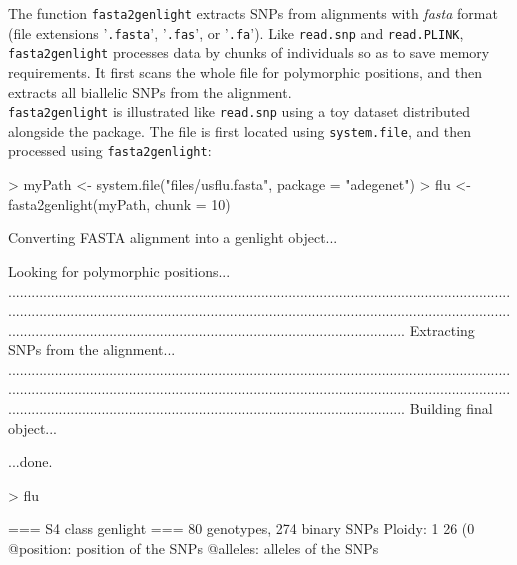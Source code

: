 \documentclass{article}
\begin{document}
The function \texttt{fasta2genlight} extracts SNPs from alignments with \textit{fasta} format (file
extensions '\texttt{.fasta}', '\texttt{.fas}', or '\texttt{.fa}').
Like \texttt{read.snp} and \texttt{read.PLINK}, \texttt{fasta2genlight} processes data by chunks of
individuals so as to save memory requirements.
It first scans the whole file for polymorphic positions, and then extracts all biallelic SNPs from
the alignment.
\\

\texttt{fasta2genlight} is illustrated like \texttt{read.snp} using a toy dataset distributed
alongside the package.
The file is first located using \texttt{system.file}, and then processed using \texttt{fasta2genlight}:
\begin{Schunk}
\begin{Sinput}
> myPath <- system.file("files/usflu.fasta", package = "adegenet")
> flu <- fasta2genlight(myPath, chunk = 10)
\end{Sinput}
\begin{Soutput}
 Converting FASTA alignment into a genlight object... 


 Looking for polymorphic positions... 
........................................................................................................................................................................................................................................................................................................................................................................
 Extracting SNPs from the alignment... 
........................................................................................................................................................................................................................................................................................................................................................................
 Building final object... 

...done.
\end{Soutput}
\begin{Sinput}
> flu
\end{Sinput}
\begin{Soutput}
 === S4 class genlight ===
 80 genotypes,  274 binary SNPs
 Ploidy: 1
 26 (0 %
 @position: position of the SNPs
 @alleles: alleles of the SNPs
\end{Soutput}
\end{Schunk}
\end{document}
